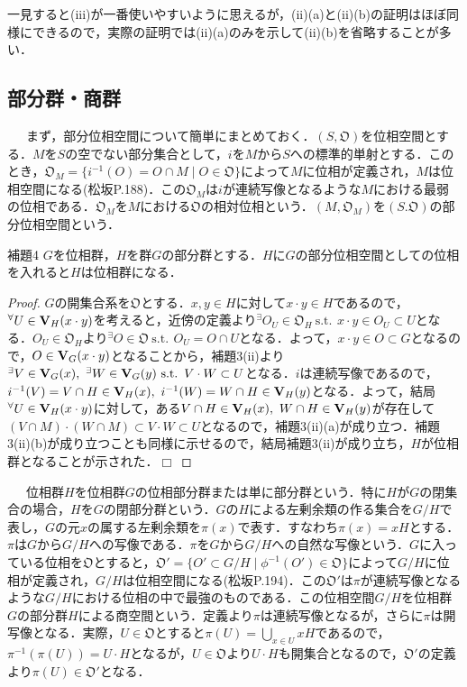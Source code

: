 \documentclass[a4paper,11pt]{jsarticle}
\newtheorem{proof}{証明}
\def\qed{\hfill $\Box$}
\newcommand{\st}{\mathrm{s.t.}\,}  %
\begin{document}
一見すると(iii)が一番使いやすいように思えるが，(ii)(a)と(ii)(b)の証明はほぼ同様にできるので，実際の証明では(ii)(a)のみを示して(ii)(b)を省略することが多い．
%
%
%
\subsection{部分群・商群}
{\ }{\ }{\ }まず，部分位相空間について簡単にまとめておく．$(S,\mathfrak{O})$を位相空間とする．$M$を$S$の空でない部分集合として，$i$を$M$から$S$への標準的単射とする．このとき，$\mathfrak{O}_M=\{i^{-1}(O)=O\cap M \mid O\in\mathfrak{O}\}$によって$M$に位相が定義され，$M$は位相空間になる(松坂P.188)．この$\mathfrak{O}_M$は$i$が連続写像となるような$M$における最弱の位相である．$\mathfrak{O}_M$を$M$における$\mathfrak{O}$の相対位相という．$(M,\mathfrak{O}_M)$を$(S.\mathfrak{O})$の部分位相空間という．
%
%
%
\begin{itembox}[l]{補題4}
$G$を位相群，$H$を群$G$の部分群とする．$H$に$G$の部分位相空間としての位相を入れると$H$は位相群になる．
\end{itembox}
\vspace{-1zh}%
\vspace{-1zh}%
\begin{proof}
$G$の開集合系を$\mathfrak{O}$とする．$x,y\in H$に対して$x\cdot y\in H$であるので，$^\forall U\in{\bf V}_H(x\cdot y)$を考えると，近傍の定義より$^\exists O_U\in\mathfrak{O}_H{\ }\st{\ }x\cdot y\in O_U\subset U$となる．$O_U\in\mathfrak{O}_H$より$^\exists O\in\mathfrak{O}{\ }\st{\ }O_U=O\cap U$となる．よって，$x\cdot y\in O\subset G$となるので，$O\in{\bf V}_G(x\cdot y)$となることから，補題3(ii)より$^\exists V\in{\bf V}_G(x),{\ } ^\exists W\in{\bf V}_G(y){\ }\st{\ }V\cdot W\subset U$となる．$i$は連続写像であるので，$i^{-1}(V)=V\cap H\in{\bf V}_H(x),{\ }i^{-1}(W)=W\cap H\in{\bf V}_H(y)$となる．よって，結局$^\forall U\in{\bf V}_H(x\cdot y)$に対して，ある$V\cap H\in{\bf V}_H(x),{\ }W\cap H\in{\bf V}_H(y)$が存在して$(V\cap M)\cdot(W\cap M)\subset V\cdot W\subset U$となるので，補題3(ii)(a)が成り立つ．補題3(ii)(b)が成り立つことも同様に示せるので，結局補題3(ii)が成り立ち，$H$が位相群となることが示された．\qed
\end{proof}
{\ }{\ }{\ }位相群$H$を位相群$G$の位相部分群または単に部分群という．特に$H$が$G$の閉集合の場合，$H$を$G$の閉部分群という．$G$の$H$による左剰余類の作る集合を$G/H$で表し，$G$の元$x$の属する左剰余類を$\pi(x)$で表す．すなわち$\pi(x)=xH$とする．$\pi$は$G$から$G/H$への写像である．$\pi$を$G$から$G/H$への自然な写像という．$G$に入っている位相を$\mathfrak{O}$とすると，$\mathfrak{O}'=\{O'\subset G/H \mid \phi^{-1}(O')\in\mathfrak{O}\}$によって$G/H$に位相が定義され，$G/H$は位相空間になる(松坂P.194)．この$\mathfrak{O}'$は$\pi$が連続写像となるような$G/H$における位相の中で最強のものである．この位相空間$G/H$を位相群$G$の部分群$H$による商空間という．定義より$\pi$は連続写像となるが，さらに$\pi$は開写像となる．実際，$U\in\mathfrak{O}$とすると$\pi(U)=\underset{x\in U}{\bigcup}xH$であるので，$\pi^{-1}(\pi(U))=U\cdot H$となるが，$U\in\mathfrak{O}$より$U\cdot H$も開集合となるので，$\mathfrak{O}'$の定義より$\pi(U)\in \mathfrak{O}'$となる．\\
\end{document}
